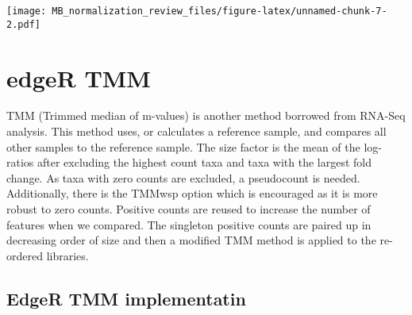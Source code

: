 \documentclass[
]{book}
\begin{document}
\texttt{[image: MB\_normalization\_review\_files/figure-latex/unnamed-chunk-7-2.pdf]}

\hypertarget{edger-tmm}{%
\chapter{edgeR TMM}\label{edger-tmm}}

TMM (Trimmed median of m-values) is another method borrowed from RNA-Seq analysis. This method uses, or calculates a reference sample, and compares all other samples to the reference sample. The size factor is the mean of the log-ratios after excluding the highest count taxa and taxa with the largest fold change. As taxa with zero counts are excluded, a pseudocount is needed. Additionally, there is the TMMwsp option which is encouraged as it is more robust to zero counts. Positive counts are reused to increase the number of features when we compared. The singleton positive counts are paired up in decreasing order of size and then a modified TMM method is applied to the re-ordered libraries.

\hypertarget{edger-tmm-implementatin}{%
\section{EdgeR TMM implementatin}\label{edger-tmm-implementatin}}
\end{document}
